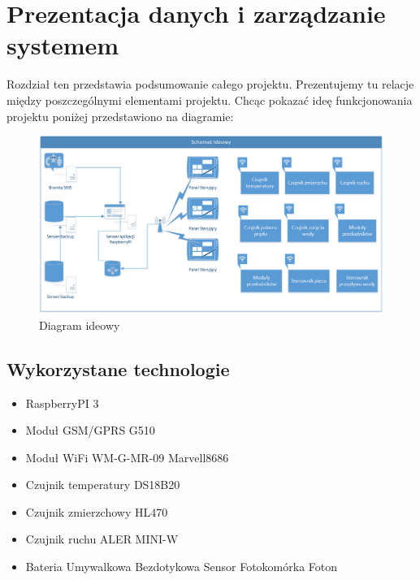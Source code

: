 \documentclass[12pt]{article} %
\begin{document}
\section{Prezentacja danych i zarządzanie systemem}
Rozdział ten przedstawia podsumowanie całego projektu. Prezentujemy tu relacje między poszczególnymi elementami projektu. Chcąc pokazać ideę funkcjonowania projektu poniżej przedstawiono na diagramie:
\begin{figure}[!h]
  \centering
  \includegraphics[width=\columnwidth]{images/Rysunek1.png}
  \caption{Diagram ideowy}
\end{figure}

\subsection{Wykorzystane technologie}
\begin{itemize}
\item RaspberryPI 3
\item Moduł GSM/GPRS G510
\item Moduł WiFi WM-G-MR-09 Marvell8686 
\item Czujnik temperatury DS18B20
\item Czujnik zmierzchowy HL470
\item Czujnik ruchu ALER MINI-W
\item Bateria Umywalkowa Bezdotykowa Sensor Fotokomórka Foton
\end{itemize}
\end{document}
